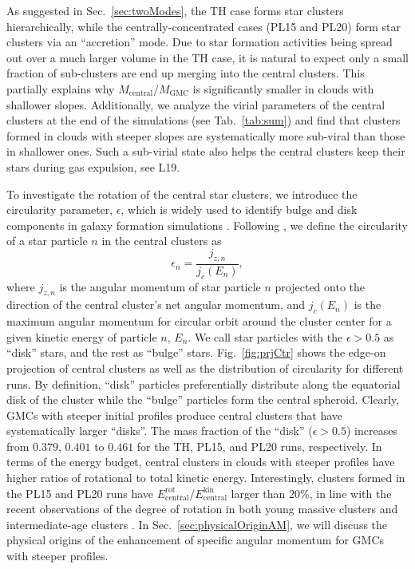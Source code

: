 \documentclass[fleqn,usenatbib]{mnras}
\begin{document}
As suggested in Sec.~\ref{sec:twoModes}, the TH case forms star clusters hierarchically, while the centrally-concentrated cases (PL15 and PL20) form star clusters via an ``accretion'' mode.
Due to star formation activities being spread out over a much larger volume in the TH case, it is natural to expect only a small fraction of sub-clusters are end up merging into the central clusters.
This partially explains why $M_\mathrm{central}/M_\mathrm{GMC}$ is significantly smaller in clouds with shallower slopes.
Additionally, we analyze the virial parameters of the central clusters at the end of the simulations (see Tab.~\ref{tab:sum}) and find that clusters formed in clouds with steeper slopes are systematically more sub-viral than those in shallower ones.
Such a sub-virial state also helps the central clusters keep their stars during gas expulsion, see L19.

To investigate the rotation of the central star clusters, we introduce the circularity parameter, $\epsilon$, which is widely used to identify bulge and disk components in galaxy formation simulations \citep[e.g.][]{abadi_simulations_2003, martig_diversity_2012, aumer_towards_2013, marinacci_formation_2014, kannan_discs_2015, zasov_hi_2017, obreja_nihao_2016, sokolowska_galactic_2017, el-badry_gas_2018}.
Following \citet{abadi_simulations_2003, marinacci_formation_2014}, we define the circularity of a star particle $n$ in the central clusters as
\begin{equation}
    \epsilon_n=\frac{j_{z,n}}{j_c(E_n)},
    \label{eq:circularity}
\end{equation}
where $j_{z,n}$ is the angular momentum of star particle $n$ projected onto the direction of the central cluster's net angular momentum, and $j_c(E_n)$ is the maximum angular momentum for circular orbit around the cluster center for a given kinetic energy of particle $n$, $E_n$.
We call star particles with the $\epsilon>0.5$ as ``disk'' stars, and the rest as ``bulge'' stars.
Fig.~\ref{fig:prjCtr} shows the edge-on projection of central clusters as well as the distribution of circularity for different runs.
By definition, ``disk'' particles preferentially distribute along the equatorial disk of the cluster while the ``bulge'' particles form the central spheroid.
Clearly, GMCs with steeper initial profiles produce central clusters that have systematically larger ``disks''.
The mass fraction of the ``disk'' ($\epsilon>0.5$) increases from $0.379$, $0.401$ to $0.461$ for the TH, PL15, and PL20 runs, respectively.
In terms of the energy budget, central clusters in clouds with steeper profiles have higher ratios of rotational to total kinetic energy.
Interestingly, clusters formed in the PL15 and PL20 runs have $E_\mathrm{central}^\mathrm{rot}/E_\mathrm{central}^\mathrm{kin}$ larger than $20\%$, in line with the recent observations of the degree of rotation in both young massive clusters \citep[e.g.][]{henault-brunet_vlt-flames_2012} and intermediate-age clusters \citep[e.g.][]{mackey_vlt/flames_2013, kamann_linking_2019}.
In Sec.~\ref{sec:physicalOriginAM}, we will discuss the physical origins of the enhancement of specific angular momentum for GMCs with steeper profiles. 
\end{document}
